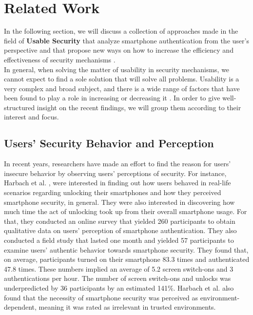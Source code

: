 \section{Related Work} \label{2.2}

In the following section, we will discuss a collection of approaches made in the field of \textbf{Usable Security} that analyze smartphone authentication from the user's perspective and that propose new ways on how to increase the efficiency and effectiveness of security mechanisms \cite{anonymous}. \\

In general, when solving the matter of usability in security mechanisms, we cannot expect to find a sole solution that will solve all problems. Usability is a very complex and broad subject, and there is a wide range of factors that have been found to play a role in increasing or decreasing it \cite{anonymous,harbach,Albayram:2017:BUL:3235924.3235929, AnatomySmartphone}. In order to give well-structured insight on the recent findings, we will group them according to their interest and focus.

\subsection{Users' Security Behavior and Perception} \label{2.2.1}

In recent years, researchers have made an effort to find the reason for users' insecure behavior by  observing users' perceptions of security. For instance, Harbach et al. \cite{harbach}, were interested in finding out how users behaved in real-life scenarios regarding unlocking their smartphones and how they perceived smartphone security, in general. They were also interested in discovering how much time the act of unlocking took up from their overall smartphone usage. For that, they conducted an online survey that yielded 260 participants to obtain qualitative data on users' perception of smartphone authentication. They also conducted a field study that lasted one month and yielded 57 participants to examine users' authentic behavior towards smartphone security. They found that, on average, participants turned on their smartphone 83.3 times and authenticated 47.8 times. These numbers implied an average of 5.2 screen switch-ons and 3 authentications per hour. The number of screen switch-ons and unlocks was underpredicted by 36 participants by an estimated 141\%. Harbach et al. \cite{harbach} also found that the necessity of smartphone security was perceived as environment-dependent, meaning it was rated as irrelevant in trusted environments.\\

